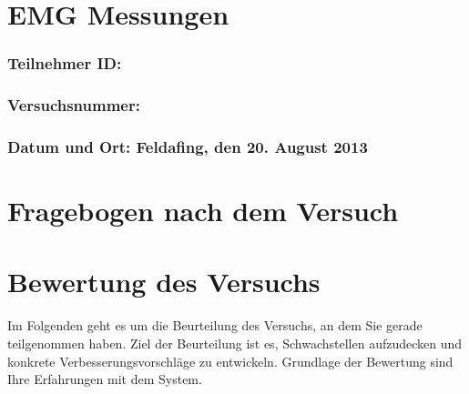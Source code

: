 \documentclass{article}
\begin{document}
\section*{EMG Messungen}

\subsubsection*{Teilnehmer ID:}
\subsubsection*{Versuchsnummer:}
\subsubsection*{Datum und Ort: Feldafing, den 20. August 2013}
\vspace{1cm}

\section*{Fragebogen nach dem Versuch}

\section{Bewertung des Versuchs}
Im Folgenden geht es um die Beurteilung des Versuchs, an dem Sie gerade teilgenommen haben. Ziel der Beurteilung ist es, Schwachstellen aufzudecken und konkrete Verbesserungsvorschläge zu entwickeln.
Grundlage der Bewertung sind Ihre Erfahrungen mit dem System.
\end{document}
